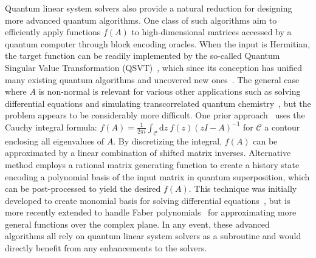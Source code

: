 \documentclass[letterpaper,onecolumn,11pt,accepted=2026-02-14]{quantumarticle}
\theoremstyle{remark}
\theoremstyle{plain}
\begin{document}
Quantum linear system solvers also provide a natural reduction for designing more advanced quantum algorithms. One class of such algorithms aim to efficiently apply functions $f(A)$ to high-dimensional matrices accessed by a quantum computer through block encoding oracles. When the input is Hermitian, the target function can be readily implemented by the so-called Quantum Singular Value Transformation (QSVT)~\cite{Gilyen2018singular}, which since its conception has unified many existing quantum algorithms and uncovered new ones~\cite{2021MartynGrand}. The general case where $A$ is non-normal is relevant for various other applications such as solving differential equations and simulating transcorrelated quantum chemistry~\cite{McArdle20}, but the problem appears to be considerably more difficult.
One prior approach~\cite{takahira2021contour,Takahira2020QuantumCauchy,Fang2023timemarchingbased,2021Yupreconditioned} uses the Cauchy integral formula: $f(A)=\frac{1}{2\pi i}\int_{\mathcal{C}}\mathrm{d}z\ f(z)(zI-A)^{-1}$ for $\mathcal{C}$ a contour enclosing all eigenvalues of $A$. By discretizing the integral, $f(A)$ can be approximated by a linear combination of shifted matrix inverses. 
Alternative method employs a rational matrix generating function to create a history state encoding a polynomial basis of the input matrix in quantum superposition, which can be post-processed to yield the desired $f(A)$.
This technique was initially developed to create monomial basis for solving differential equations~\cite{Berry2017Differential}, but is more recently extended to handle Faber polynomials~\cite{QEVP} for approximating more general functions over the complex plane. In any event, these advanced algorithms all rely on quantum linear system solvers as a subroutine and would directly benefit from any enhancements to the solvers.
\end{document}
